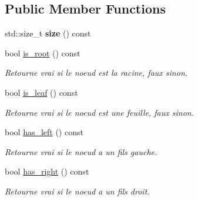 \subsection*{Public Member Functions}
\begin{DoxyCompactItemize}
\item 
\mbox{\label{classBSTreeNode_a38185eb6c1f1e481ccf9c9be63c0d7be}} 
std\+::size\+\_\+t {\bfseries size} () const
\item 
\mbox{\label{classBSTreeNode_a152a91576afe7e3da0326ae28bb582a7}} 
bool \hyperlink{classBSTreeNode_a152a91576afe7e3da0326ae28bb582a7}{is\+\_\+root} () const
\begin{DoxyCompactList}\small\item\em Retourne vrai si le noeud est la racine, faux sinon. \end{DoxyCompactList}\item 
\mbox{\label{classBSTreeNode_aca5df2aae136860532a39e160269e266}} 
bool \hyperlink{classBSTreeNode_aca5df2aae136860532a39e160269e266}{is\+\_\+leaf} () const
\begin{DoxyCompactList}\small\item\em Retourne vrai si le noeud est une feuille, faux sinon. \end{DoxyCompactList}\item 
\mbox{\label{classBSTreeNode_a8a25ff9fcd33464ba3ef8b9ef9c09203}} 
bool \hyperlink{classBSTreeNode_a8a25ff9fcd33464ba3ef8b9ef9c09203}{has\+\_\+left} () const
\begin{DoxyCompactList}\small\item\em Retourne vrai si le noeud a un fils gauche. \end{DoxyCompactList}\item 
\mbox{\label{classBSTreeNode_aa73c6b24891bac61df942c99d2b689bd}} 
bool \hyperlink{classBSTreeNode_aa73c6b24891bac61df942c99d2b689bd}{has\+\_\+right} () const
\begin{DoxyCompactList}\small\item\em Retourne vrai si le noeud a un fils droit. \end{DoxyCompactList}\item 
\mbox{\label{classBSTreeNode_a74a9baf20cf5ae5bf40ca83a5a611db9}} 

\end{DoxyCompactItemize}
